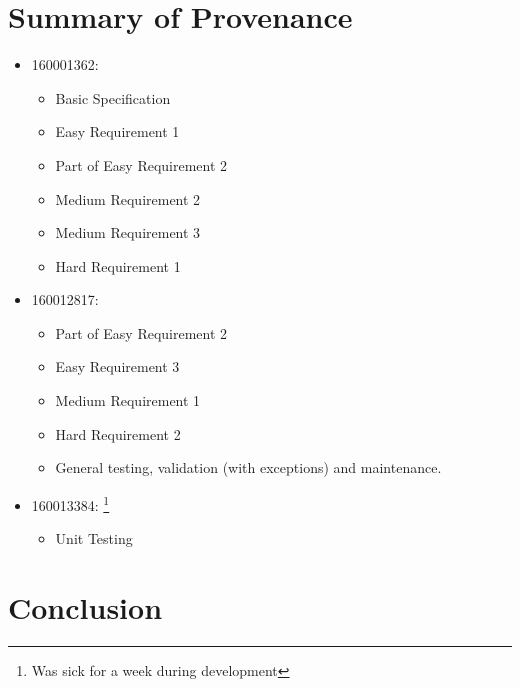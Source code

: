 \documentclass[11]{article}
\begin{document}
	\section{Summary of Provenance}
			\begin{itemize}
				\item 160001362:
					\begin{itemize}
						\item Basic Specification
						\item Easy Requirement 1
						\item Part of Easy Requirement 2
						\item Medium Requirement 2
						\item Medium Requirement 3
						\item Hard Requirement 1
					\end{itemize}
					
				\item 160012817:
					\begin{itemize}
						\item Part of Easy Requirement 2
						\item Easy Requirement 3
						\item Medium Requirement 1
						\item Hard Requirement 2
						\item General testing, validation (with exceptions) and maintenance.
					\end{itemize}
					
				\item 160013384: \footnote{Was sick for a week during development}
					\begin{itemize}
						\item Unit Testing 
					\end{itemize}
			\end{itemize}
				
	
\section{Conclusion}
\end{document}
